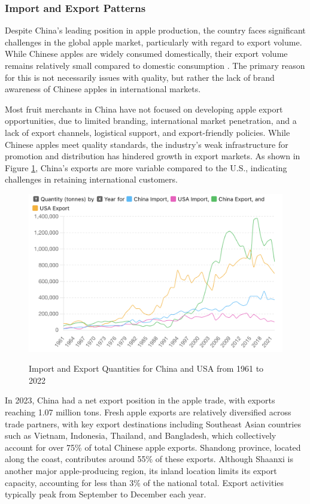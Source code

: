 \subsubsection{Import and Export Patterns}
\noindent Despite China's leading position in apple production, the country faces significant challenges in the global apple market, particularly with regard to export volume. While Chinese apples are widely consumed domestically, their export volume remains relatively small compared to domestic consumption \citep{ma_qin_2022}. The primary reason for this is not necessarily issues with quality, but rather the lack of brand awareness of Chinese apples in international markets. 

Most fruit merchants in China have not focused on developing apple export opportunities, due to limited branding, international market penetration, and a lack of export channels, logistical support, and export-friendly policies. While Chinese apples meet quality standards, the industry's weak infrastructure for promotion and distribution has hindered growth in export markets. As shown in Figure \ref{fig: import export}, China's exports are more variable compared to the U.S., indicating challenges in retaining international customers.

\begin{figure}[hpt]
    \centering
        \caption{Import and Export Quantities for China and USA from 1961 to 2022}
    \includegraphics[width=\linewidth]{figures/import_export.png}
    \label{fig: import export}
\end{figure}

In 2023, China had a net export position in the apple trade, with exports reaching 1.07 million tons. Fresh apple exports are relatively diversified across trade partners, with key export destinations including Southeast Asian countries such as Vietnam, Indonesia, Thailand, and Bangladesh, which collectively account for over 75\% of total Chinese apple exports. Shandong province, located along the coast, contributes around 55\% of these exports. Although Shaanxi is another major apple-producing region, its inland location limits its export capacity, accounting for less than 3\% of the national total. Export activities typically peak from September to December each year.

